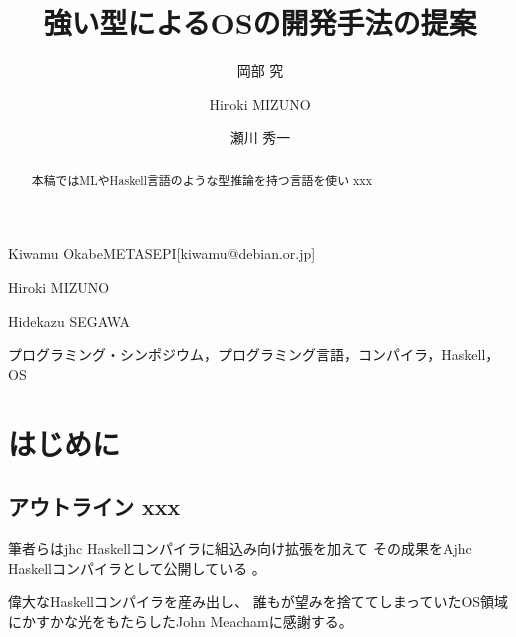 \documentclass[submit,techreq,noauthor]{ipsj}
\begin{document}
\title{強い型によるOSの開発手法の提案}


\author{岡部 究}{Kiwamu Okabe}{METASEPI}[kiwamu@debian.or.jp]
\author{Hiroki MIZUNO}{Hiroki MIZUNO}{}
\author{瀬川 秀一}{Hidekazu SEGAWA}{}

\begin{abstract}
本稿ではMLやHaskell言語のような型推論を持つ言語を使い xxx
\end{abstract}

\begin{jkeyword}
プログラミング・シンポジウム，プログラミング言語，コンパイラ，Haskell，OS
\end{jkeyword}

\maketitle

\section{はじめに}

\subsection{アウトライン xxx}

筆者らはjhc Haskellコンパイラに組込み向け拡張を加えて \cite{j-ikamusume5}
その成果をAjhc Haskellコンパイラとして公開している \cite{ajhc} 。

\begin{acknowledgment}
偉大なHaskellコンパイラを産み出し、
誰もが望みを捨ててしまっていたOS領域にかすかな光をもたらしたJohn Meachamに感謝する。
\end{acknowledgment}




\begin{biography}
\end{biography}
\end{document}
